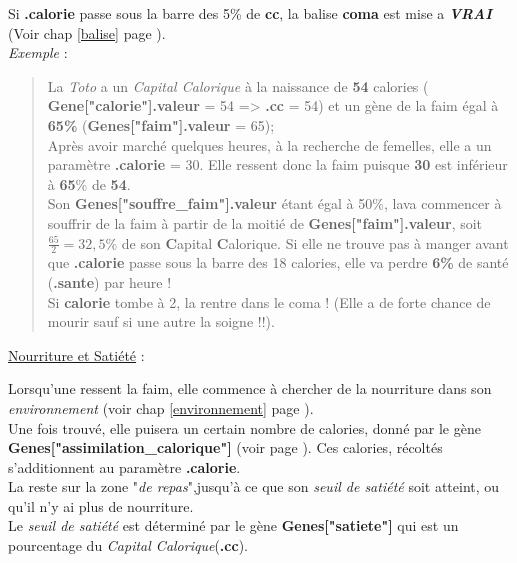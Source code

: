 \documentclass[french]{report}
\begin{document}
Si \textbf{.calorie} passe sous la barre des 5\% de \textbf{cc}, la balise \textbf{coma} est mise a \textbf{\textit{VRAI}} (Voir chap \ref{balise} page \pageref{balise}).\\

\textit{Exemple} :\\
\begin{quote}
	La \CoCiX \emph{Toto} a un \textit{Capital Calorique} à la naissance de \textbf{54} calories ( \textbf{Gene["calorie"].valeur} = 54 => \textbf{.cc} = 54) et un gène de la faim égal à \textbf{65\%} (\textbf{Genes["faim"].valeur} = 65); \\
	
	Après avoir marché quelques heures, à la recherche de femelles, elle a un paramètre \textbf{.calorie} = 30. Elle ressent donc la faim puisque \textbf{30} est inférieur à \textbf{65}\% de \textbf{54}.\\
	
	Son \textbf{Genes["souffre\_faim"].valeur} étant égal à 50\%, la\CoCiX va commencer à souffrir de la faim à partir de la moitié de \textbf{Genes["faim"].valeur}, soit $\frac{65}{2} = 32,5\%$ de son \textbf{C}apital \textbf{C}alorique. Si elle ne trouve pas à manger avant que \textbf{.calorie} passe sous la barre des 18 calories, elle va perdre \textbf{6\%} de santé (\textbf{.sante}) par heure !\\
	
	Si \textbf{calorie} tombe à 2, la \CoCiX  rentre dans le coma ! (Elle a de forte chance de mourir sauf si une autre \CoCiX la soigne !!).
\end{quote}


\begin{center}
	\underline{Nourriture et Satiété} :\label{nourrir}
\end{center}
Lorsqu'une \CoCiX ressent la faim, elle commence à chercher de la nourriture dans son \textit{environnement} (voir chap \ref{environnement} page \pageref{environnement}).\\
Une fois trouvé, elle puisera un certain nombre de calories, donné par le gène\\ \textbf{Genes["assimilation\_calorique"]} (voir page \pageref{liste_gene}). Ces calories, récoltés s'additionnent au paramètre \textbf{.calorie}.\\

La \CoCiX reste sur la zone "\textit{de repas}",jusqu'à ce que son \textit{seuil de satiété} soit atteint, ou qu'il n'y ai plus de nourriture.\\
Le \textit{seuil de satiété} est déterminé par le gène \textbf{Genes["satiete"]} qui est un pourcentage du \textit{Capital Calorique}(\textbf{.cc}).\\
\end{document}
